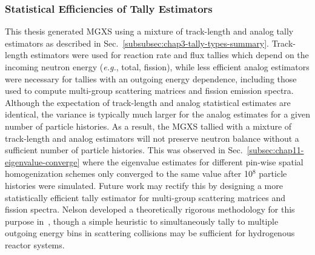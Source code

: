 

\subsubsection{Statistical Efficiencies of Tally Estimators}
\label{subsubsec:chap12-tally-estimators}

This thesis generated \ac{MGXS} using a mixture of track-length and analog tally estimators as described in Sec.~\ref{subsubsec:chap3-tally-types-summary}. Track-length estimators were used for reaction rate and flux tallies which depend on the incoming neutron energy (\textit{e.g.}, total, fission), while less efficient analog estimators were necessary for tallies with an outgoing energy dependence, including those used to compute multi-group scattering matrices and fission emission spectra. Although the expectation of track-length and analog statistical estimates are identical, the variance is typically much larger for the analog estimates for a given number of particle histories. As a result, the \ac{MGXS} tallied with a mixture of track-length and analog estimators will not preserve neutron balance without a sufficient number of particle histories. This was observed in Sec.~\ref{subsec:chap11-eigenvalue-converge} where the eigenvalue estimates for different pin-wise spatial homogenization schemes only converged to the same value after 10$^{8}$ particle histories were simulated. Future work may rectify this by designing a more statistically efficient tally estimator for multi-group scattering matrices and fission spectra. Nelson developed a theoretically rigorous methodology for this purpose in~\cite{nelson2014improved}, though a simple heuristic to simultaneously tally to multiple outgoing energy bins in scattering collisions may be sufficient for hydrogenous reactor systems.


